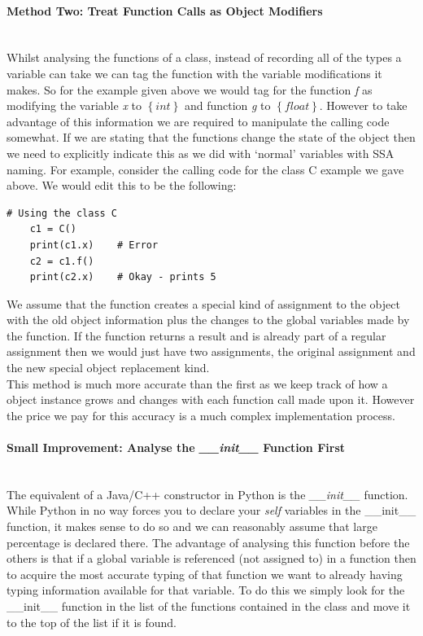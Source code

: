 \documentclass[12pt, titlepage]{article}
\begin{document}
\paragraph{Method Two: Treat Function Calls as Object Modifiers}\mbox{}\\
Whilst analysing the functions of a class, instead of recording all of the types a variable can take we can tag the function with the variable modifications it makes. So for the example given above we would tag for the function \textit{f} as modifying the variable \textit{x} to $\left\{ {int}\right\}$ and function \textit{g} to $\left\{ {float}\right\}$. However to take advantage of this information we are required to manipulate the calling code somewhat. If we are stating that the functions change the state of the object then we need to explicitly indicate this as we did with `normal' variables with SSA naming. For example, consider the calling code for the class C example we gave above. We would edit this to be the following:
\begin{lstlisting}[mathescape]
	# Using the class C
	c1 = C()
	print(c1.x)    # Error
	c2 = c1.f()
	print(c2.x)    # Okay - prints 5
\end{lstlisting}
We assume that the function creates a special kind of assignment to the object with the old object information plus the changes to the global variables made by the function. If the function returns a result and is already part of a regular assignment then we would just have two assignments, the original assignment and the new special object replacement kind. \\
This method is much more accurate than the first as we keep track of how a object instance grows and changes with each function call made upon it. However the price we pay for this accuracy is a much complex implementation process.

\paragraph{Small Improvement: Analyse the \textit{\_\_init\_\_} Function First}\mbox{}\\
The equivalent of a Java/C++ constructor in Python is the \textit{\_\_init\_\_} function. While Python in no way forces you to declare your \textit{self} variables in the \_\_init\_\_ function, it makes sense to do so and we can reasonably assume that large percentage is declared there. The advantage of analysing this function before the others is that if a global variable is referenced (not assigned to) in a function then to acquire the most accurate typing of that function we want to already having typing information available for that variable. To do this we simply look for the \_\_init\_\_ function in the list of the functions contained in the class and move it to the top of the list if it is found.
\end{document}
